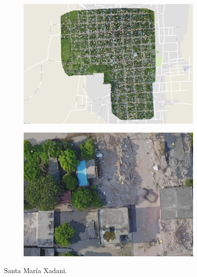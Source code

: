 \begin{figure}[!h]
  \centering
    \begin{subfigure}{.9\textwidth}
        \includegraphics[width=\textwidth]{images/santamaria-ortho.jpg}
    \end{subfigure}
    \begin{subfigure}{.9\textwidth}
        \includegraphics[width=\textwidth]{images/santamaria-example.jpg}
    \end{subfigure}
  \caption{Santa Mar\'ia Xadani.}
  \label{fig:santamaria-gis}
\end{figure}

